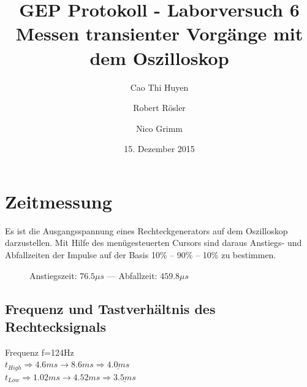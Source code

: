 \documentclass[11pt,a4paper,titlepage]{article}
\begin{document}
\title{GEP Protokoll - Laborversuch 6\\[1ex]
Messen transienter Vorg\"ange mit dem Oszilloskop}
\author{Cao Thi Huyen \and Robert R\"osler \and Nico Grimm}
\date{15. Dezember 2015}

\maketitle

\section{Zeitmessung}
Es ist die Ausgangsspannung eines Rechteckgenerators auf dem Oszilloskop darzustellen. Mit Hilfe des men\"ugesteuerten Cursors sind daraus Anstiegs- und Abfallzeiten der Impulse auf der Basis 10\% -- 90\% -- 10\% zu bestimmen.

\begin{figure}[h!]
  \caption{Anstiegszeit: $76.5\mu s$ --- Abfallzeit: $459.8\mu{}s$}
\end{figure}

\subsection{Frequenz und Tastverh\"altnis des Rechtecksignals}
Frequenz f=124Hz \\
$t_{High} \Rightarrow 4.6 ms \to 8.6 ms \Rightarrow \underline{4.0 ms}$ \\
$t_{Low} \Rightarrow 1.02 ms \to 4.52 ms \Rightarrow \underline{3.5 ms}$
\end{document}

